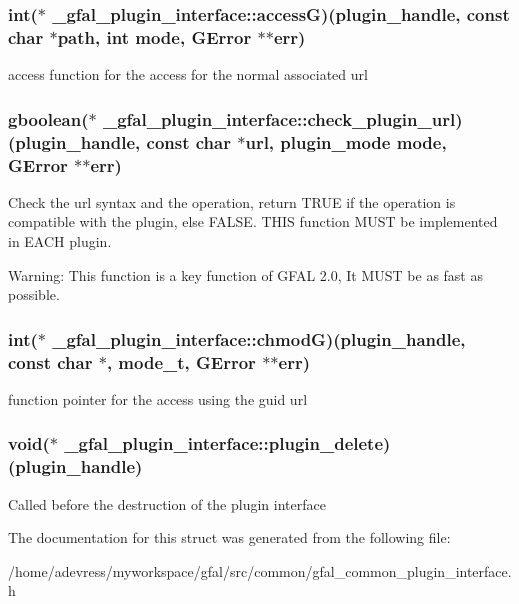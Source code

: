 \subsubsection{\setlength{\rightskip}{0pt plus 5cm}int($\ast$ \bf{\_\-gfal\_\-plugin\_\-interface::access\-G})(plugin\_\-handle, const char $\ast$path, int mode, GError $\ast$$\ast$err)}\label{struct__gfal__plugin__interface_1fa81d7a219629281c14b05116d32202}


access function for the access for the normal associated url 
\subsubsection{\setlength{\rightskip}{0pt plus 5cm}gboolean($\ast$ \bf{\_\-gfal\_\-plugin\_\-interface::check\_\-plugin\_\-url})(plugin\_\-handle, const char $\ast$url, plugin\_\-mode mode, GError $\ast$$\ast$err)}\label{struct__gfal__plugin__interface_e1ab2d2c3ea35095446a2c14734b5f4c}


Check the url syntax and the operation, return TRUE if the operation is compatible with the plugin, else FALSE. THIS function MUST be implemented in EACH plugin. \begin{Desc}
\item[Warning:]This function is a key function of GFAL 2.0, It MUST be as fast as possible. \end{Desc}
\subsubsection{\setlength{\rightskip}{0pt plus 5cm}int($\ast$ \bf{\_\-gfal\_\-plugin\_\-interface::chmod\-G})(plugin\_\-handle, const char $\ast$, mode\_\-t, GError $\ast$$\ast$err)}\label{struct__gfal__plugin__interface_e032ec6f13423ea516ca4c02332f5ecf}


function pointer for the access using the guid url 
\subsubsection{\setlength{\rightskip}{0pt plus 5cm}void($\ast$ \bf{\_\-gfal\_\-plugin\_\-interface::plugin\_\-delete})(plugin\_\-handle)}\label{struct__gfal__plugin__interface_d146f62bd310f1f265f0bc3c37cc70d8}


Called before the destruction of the plugin interface 

The documentation for this struct was generated from the following file:\begin{CompactItemize}
\item 
/home/adevress/myworkspace/gfal/src/common/gfal\_\-common\_\-plugin\_\-interface.h\end{CompactItemize}
